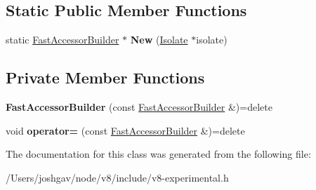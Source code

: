 \subsection*{Static Public Member Functions}
\begin{DoxyCompactItemize}
\item 
static \hyperlink{classv8_1_1experimental_1_1_fast_accessor_builder}{Fast\+Accessor\+Builder} $\ast$ {\bfseries New} (\hyperlink{classv8_1_1_isolate}{Isolate} $\ast$isolate)\hypertarget{classv8_1_1experimental_1_1_fast_accessor_builder_a2e0a7009b83376ae2f45b78159cd392c}{}\label{classv8_1_1experimental_1_1_fast_accessor_builder_a2e0a7009b83376ae2f45b78159cd392c}

\end{DoxyCompactItemize}
\subsection*{Private Member Functions}
\begin{DoxyCompactItemize}
\item 
{\bfseries Fast\+Accessor\+Builder} (const \hyperlink{classv8_1_1experimental_1_1_fast_accessor_builder}{Fast\+Accessor\+Builder} \&)=delete\hypertarget{classv8_1_1experimental_1_1_fast_accessor_builder_aad57de2056ac00fc77a8b9c5d9ff9951}{}\label{classv8_1_1experimental_1_1_fast_accessor_builder_aad57de2056ac00fc77a8b9c5d9ff9951}

\item 
void {\bfseries operator=} (const \hyperlink{classv8_1_1experimental_1_1_fast_accessor_builder}{Fast\+Accessor\+Builder} \&)=delete\hypertarget{classv8_1_1experimental_1_1_fast_accessor_builder_a9293ec9344bae9e233b9155651458f8c}{}\label{classv8_1_1experimental_1_1_fast_accessor_builder_a9293ec9344bae9e233b9155651458f8c}

\end{DoxyCompactItemize}


The documentation for this class was generated from the following file\+:\begin{DoxyCompactItemize}
\item 
/\+Users/joshgav/node/v8/include/v8-\/experimental.\+h\end{DoxyCompactItemize}
